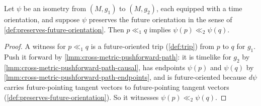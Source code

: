 \begin{lemma}
    \label{lmm:cross-metric-isometry-preserves-chronology}
    Let $\psi$ be an isometry from $(M,g_1)$ to $(M,g_2)$, each equipped with a time orientation, and suppose $\psi$ preserves the future orientation in the sense of \ref{def:preserves-future-orientation}. Then $p \ll_1 q$ implies $\psi(p) \ll_2 \psi(q)$.
\end{lemma}
\begin{proof}
    A witness for $p \ll_1 q$ is a future-oriented trip (\ref{def:trip}) from $p$ to $q$ for $g_1$. Push it forward by \ref{lmm:cross-metric-pushforward-path}: it is timelike for $g_2$ by \ref{lmm:cross-metric-pushforward-path-causal}, has endpoints $\psi(p)$ and $\psi(q)$ by \ref{lmm:cross-metric-pushforward-path-endpoints}, and is future-oriented because $d\psi$ carries future-pointing tangent vectors to future-pointing tangent vectors (\ref{def:preserves-future-orientation}). So it witnesses $\psi(p) \ll_2 \psi(q)$.
\end{proof}


